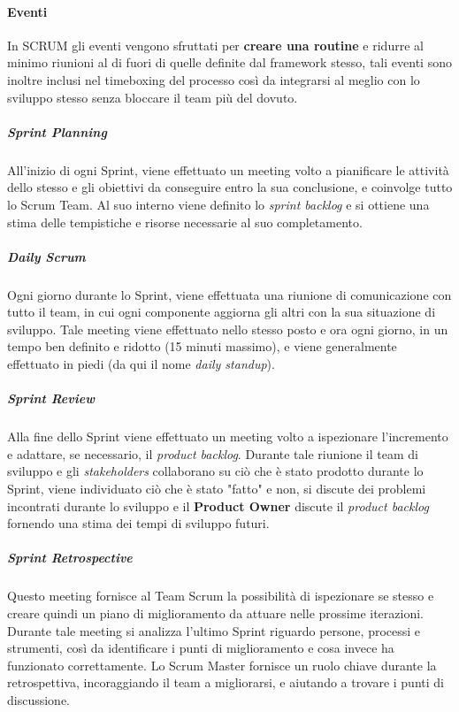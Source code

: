 \documentclass[a4paper,12pt]{report}
\begin{document}
				\paragraph{Eventi}
				In SCRUM gli eventi vengono sfruttati per \textbf{creare una routine} e ridurre al minimo riunioni al di fuori di quelle definite
				dal framework stesso, tali eventi sono inoltre inclusi nel timeboxing del processo così da integrarsi al meglio con lo sviluppo stesso senza bloccare il team più del dovuto.
				
					\subparagraph{Sprint Planning}
					All'inizio di ogni Sprint, viene effettuato un meeting volto a pianificare le attività dello stesso e gli obiettivi da conseguire entro la sua conclusione, e coinvolge tutto lo Scrum Team. Al suo interno viene definito
					lo \emph{sprint backlog} e si ottiene una stima delle tempistiche e risorse necessarie al suo completamento.
					
					\subparagraph{Daily Scrum}
					Ogni giorno durante lo Sprint, viene effettuata una riunione di comunicazione con tutto il team, in cui ogni componente aggiorna gli altri con la sua situazione di sviluppo. Tale meeting viene effettuato nello stesso
					posto e ora ogni giorno, in un tempo ben definito e ridotto (15 minuti massimo), e viene generalmente effettuato
					in piedi (da qui il nome \emph{daily standup}).
					
					\subparagraph{Sprint Review}
					Alla fine dello Sprint viene effettuato un meeting volto a ispezionare l'incremento e adattare, se necessario,
					il \emph{product backlog}. Durante tale riunione il team di sviluppo e gli \emph{stakeholders} collaborano su
					ciò che è stato prodotto durante lo Sprint, viene individuato ciò che è stato "fatto" e non, si discute dei
					problemi incontrati durante lo sviluppo e il \textbf{Product Owner} discute il \emph{product backlog} fornendo una stima dei tempi di sviluppo futuri.
					
					\subparagraph{Sprint Retrospective}
					Questo meeting fornisce al Team Scrum la possibilità di ispezionare se stesso e creare quindi un piano di miglioramento da attuare nelle prossime iterazioni. Durante tale meeting si analizza l'ultimo Sprint riguardo
					persone, processi e strumenti, così da identificare i punti di miglioramento e cosa invece ha funzionato correttamente. Lo Scrum Master fornisce un ruolo chiave durante la retrospettiva, incoraggiando il team a migliorarsi,
					e aiutando a trovare i punti di discussione.
							
\end{document}
